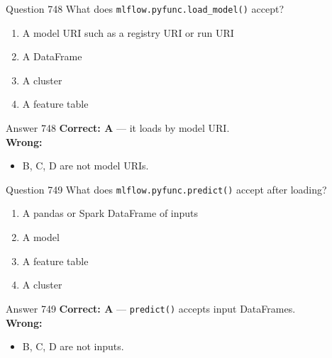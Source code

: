 \documentclass[aspectratio=169,11pt]{beamer}
\begin{document}
	\begin{frame}{Question 748}
		What does \texttt{mlflow.pyfunc.load\_model()} accept?
		\begin{enumerate}[label=\Alph*.]
			\item A model URI such as a registry URI or run URI
			\item A DataFrame
			\item A cluster
			\item A feature table
		\end{enumerate}
	\end{frame}
	\begin{frame}{Answer 748}
		\textbf{Correct: A} --- it loads by model URI.\\
		\vspace{0.5em}
		\textbf{Wrong:}
		\begin{itemize}
			\item B, C, D are not model URIs.
		\end{itemize}
	\end{frame}
	
	\begin{frame}{Question 749}
		What does \texttt{mlflow.pyfunc.predict()} accept after loading?
		\begin{enumerate}[label=\Alph*.]
			\item A pandas or Spark DataFrame of inputs
			\item A model
			\item A feature table
			\item A cluster
		\end{enumerate}
	\end{frame}
	\begin{frame}{Answer 749}
		\textbf{Correct: A} --- \texttt{predict()} accepts input DataFrames.\\
		\vspace{0.5em}
		\textbf{Wrong:}
		\begin{itemize}
			\item B, C, D are not inputs.
		\end{itemize}
	\end{frame}
	
\end{document}

